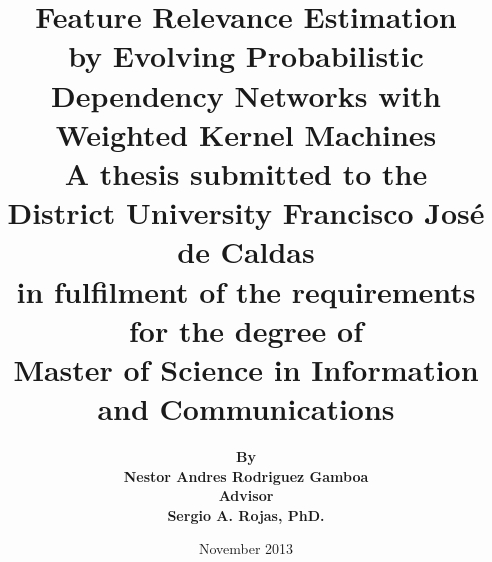 \title
{
\huge{\textbf 
{Feature Relevance Estimation \\
by Evolving Probabilistic\\
Dependency Networks with\\
Weighted Kernel Machines}}\\
\vspace{1.0in}
\singlespacing
{\Large \textbf{A thesis submitted to the\\
District University Francisco Jos\'e de Caldas\\
in fulfilment of the requirements for the degree of\\
Master of Science in Information and Communications\\}}}
\date{November 2013}
\author{
\large \textbf{By} \\ \textbf{Nestor Andres Rodriguez Gamboa} \\ \textbf{Advisor} \\ \textbf{Sergio A. Rojas, PhD.}}
\maketitle
